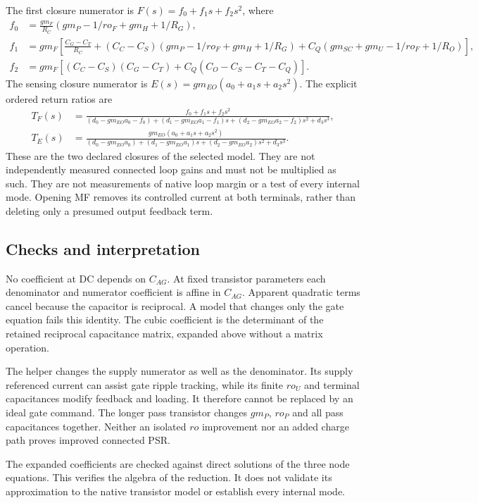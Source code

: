 \documentclass[11pt]{article}
\begin{document}
The first closure numerator is $F(s)=f_0+f_1s+f_2s^2$, where
\begin{align}
f_0&=\frac{gm_F}{R_C}(gm_P-1/ro_F+gm_H+1/R_G),\\
f_1&=gm_F\left[\frac{C_G-C_T}{R_C}
+(C_C-C_S)(gm_P-1/ro_F+gm_H+1/R_G)
+C_Q(gm_{SC}+gm_U-1/ro_F+1/R_O)\right],\\
f_2&=gm_F\left[(C_C-C_S)(C_G-C_T)
+C_Q(C_O-C_S-C_T-C_Q)\right].
\end{align}
The sensing closure numerator is $E(s)=gm_{EO}(a_0+a_1s+a_2s^2)$. The explicit ordered return ratios are
\begin{align}
T_F(s)&=\frac{f_0+f_1s+f_2s^2}
{(d_0-gm_{EO}a_0-f_0)+(d_1-gm_{EO}a_1-f_1)s
+(d_2-gm_{EO}a_2-f_2)s^2+d_3s^3},\\
T_E(s)&=\frac{gm_{EO}(a_0+a_1s+a_2s^2)}
{(d_0-gm_{EO}a_0)+(d_1-gm_{EO}a_1)s
+(d_2-gm_{EO}a_2)s^2+d_3s^3}.
\end{align}
These are the two declared closures of the selected model. They are not independently measured connected loop gains and must not be multiplied as such. They are not measurements of native loop margin or a test of every internal mode. Opening MF removes its controlled current at both terminals, rather than deleting only a presumed output feedback term.

\subsection*{Checks and interpretation}
No coefficient at DC depends on $C_{AG}$. At fixed transistor parameters each denominator and numerator coefficient is affine in $C_{AG}$. Apparent quadratic terms cancel because the capacitor is reciprocal. A model that changes only the gate equation fails this identity. The cubic coefficient is the determinant of the retained reciprocal capacitance matrix, expanded above without a matrix operation.

The helper changes the supply numerator as well as the denominator. Its supply referenced current can assist gate ripple tracking, while its finite $ro_U$ and terminal capacitances modify feedback and loading. It therefore cannot be replaced by an ideal gate command. The longer pass transistor changes $gm_P$, $ro_P$ and all pass capacitances together. Neither an isolated $ro$ improvement nor an added charge path proves improved connected PSR.

The expanded coefficients are checked against direct solutions of the three node equations. This verifies the algebra of the reduction. It does not validate its approximation to the native transistor model or establish every internal mode.
\end{document}

